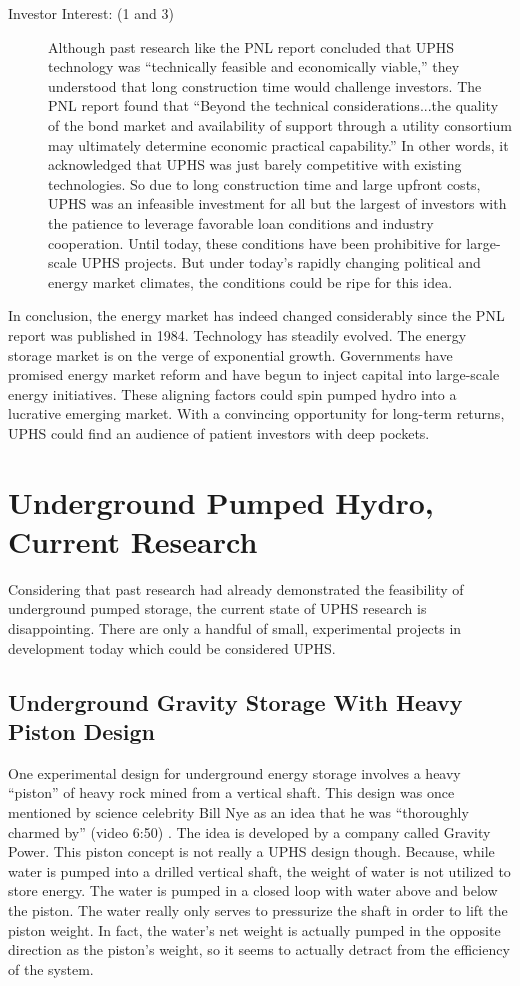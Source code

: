 \documentclass[hidelinks,12pt,a4paper]{article}
\begin{document}
{\begin{description}
    \item[Investor Interest: (1 and 3)] Although past research like the PNL report concluded that UPHS technology was “technically feasible and economically viable,” they understood that long construction time would challenge investors. The PNL report found that “Beyond the technical considerations...the quality of the bond market and availability of support through a utility consortium may ultimately determine economic practical capability.” In other words, it acknowledged that UPHS was just barely competitive with existing technologies. So due to long construction time and large upfront costs, UPHS was an infeasible investment for all but the largest of investors with the patience to leverage favorable loan conditions and industry cooperation. Until today, these conditions have been prohibitive for large-scale UPHS projects. But under today's rapidly changing political and energy market climates, the conditions could be ripe for this idea.
\end{description}
}

In conclusion, the energy market has indeed changed considerably since the PNL report was published in 1984. Technology has steadily evolved. The energy storage market is on the verge of exponential growth. Governments have promised energy market reform and have begun to inject capital into large-scale energy initiatives. These aligning factors could spin pumped hydro into a lucrative emerging market. With a convincing opportunity for long-term returns, UPHS could find an audience of patient investors with deep pockets.


\pagebreak[4]
\section{Underground Pumped Hydro, Current Research}
Considering that past research had already demonstrated the feasibility of underground pumped storage, the current state of UPHS research is disappointing. There are only a handful of small, experimental projects in development today which could be considered UPHS.

\subsection{Underground Gravity Storage With Heavy Piston Design}
One experimental design for underground energy storage involves a heavy “piston” of heavy rock mined from a vertical shaft. This design was once mentioned by science celebrity Bill Nye as an idea that he was “thoroughly charmed by” (video 6:50) \cite{BillNyeBigThinkVideo}. The idea is developed by a company called Gravity Power. This piston concept is not really a UPHS design though. Because, while water is pumped into a drilled vertical shaft, the weight of water is not utilized to store energy. The water is pumped in a closed loop with water above and below the piston. The water really only serves to pressurize the shaft in order to lift the piston weight. In fact, the water's net weight is actually pumped in the opposite direction as the piston's weight, so it seems to actually detract from the efficiency of the system. \cite{GravityPowerNewTakeOnPumpedHydroEnergyStorage}
\end{document}
